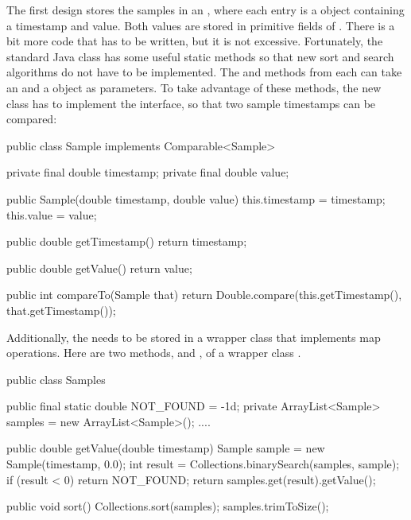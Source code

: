 The first design stores the samples in an , where each entry
is a  object containing a timestamp and value. Both values are
stored in primitive  fields of .  There is a bit
more code that has to be written, but it is not excessive. Fortunately, the
standard Java  class has some useful static methods so that
new sort and search algorithms do not have to be implemented. The 
and  methods from  each can take an
 and a  object as parameters. To take
advantage of these methods, the new  class has to implement the
 interface, so that two sample timestamps can be compared:

\begin{shortlisting}
   
    public class Sample implements Comparable<Sample> {

        private final double timestamp;
        private final double value;
	
        public Sample(double timestamp, double value) {
            this.timestamp = timestamp;
            this.value = value;
        }
	
        public double getTimestamp() {
            return timestamp;
        }
	
        public double getValue() {
            return value;
        }
	      
        public int compareTo(Sample that) {
            return Double.compare(this.getTimestamp(), that.getTimestamp());	
        }
    }

\end{shortlisting}

Additionally, the  needs to be stored in a wrapper class that
implements map operations. Here are two methods,  and
, of a wrapper class .

\begin{shortlisting}
    public class Samples {
    
    	  public final static double NOT_FOUND = -1d;
        private ArrayList<Sample> samples = new ArrayList<Sample>();
        ....
		
        public double getValue(double timestamp) {
            Sample sample = new Sample(timestamp, 0.0);
            int result = Collections.binarySearch(samples, sample);
            if (result < 0) {
            	return NOT_FOUND;
            }
            return samples.get(result).getValue();
        }
		
        public void sort() {
            Collections.sort(samples);
            samples.trimToSize();	
        }
    }
    
\end{shortlisting}
  
